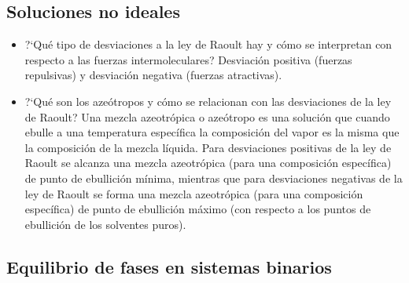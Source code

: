 \documentclass[a4paper,12pt]{article}
\begin{document}
\subsection*{Soluciones no ideales}

\begin{itemize}
 \item ?`Qu\'e tipo de desviaciones a la ley de Raoult hay y c\'omo se interpretan con respecto a las fuerzas intermoleculares? Desviaci\'on positiva (fuerzas repulsivas) y desviaci\'on negativa (fuerzas atractivas).
 \item ?`Qu\'e son los aze\'otropos y c\'omo se relacionan con las desviaciones de la ley de Raoult? Una mezcla azeotr\'opica o aze\'otropo es una soluci\'on que cuando ebulle a una temperatura espec\'ifica la composici\'on del vapor es la misma que la composici\'on de la mezcla l\'iquida. Para desviaciones positivas de la ley de Raoult se alcanza una mezcla azeotr\'opica (para una composici\'on espec\'ifica) de punto de ebullici\'on m\'inima, mientras que para desviaciones negativas de la ley de Raoult se forma una mezcla azeotr\'opica (para una composici\'on espec\'ifica) de punto de ebullici\'on m\'aximo (con respecto a los puntos de ebullici\'on de los solventes puros).
\end{itemize}

\subsection*{Equilibrio de fases en sistemas binarios}
\end{document}
